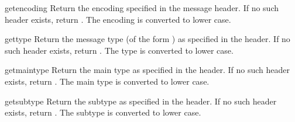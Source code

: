 \begin{methoddesc}{getencoding}{}
Return the encoding specified in the
 message header.  If no such
header exists, return .  The encoding is converted to
lower case.
\end{methoddesc}

\begin{methoddesc}{gettype}{}
Return the message type (of the form )
as specified in the  header.  If no such
header exists, return .  The type is converted to
lower case.
\end{methoddesc}

\begin{methoddesc}{getmaintype}{}
Return the main type as specified in the 
header.  If no such header exists, return .  The main
type is converted to lower case.
\end{methoddesc}

\begin{methoddesc}{getsubtype}{}
Return the subtype as specified in the 
header.  If no such header exists, return .  The subtype
is converted to lower case.
\end{methoddesc}
